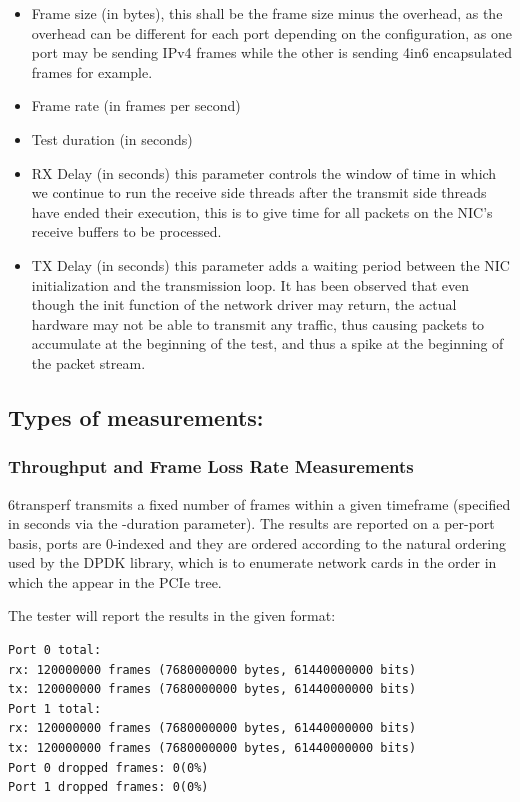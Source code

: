 \documentclass[a4paper,12p,titlepage]{article}
\begin{document}
\begin{itemize}
\item Frame size (in bytes), this shall be the frame size minus the overhead, as the overhead can be different for each port depending on the configuration, as one port may be sending IPv4 frames while the other is sending 4in6 encapsulated frames for example.


\item Frame rate (in frames per second)

\item Test duration (in seconds)

\item RX Delay (in seconds) this parameter controls the window of time in which we continue to run the receive side threads after the transmit side threads have ended their execution, this is to give time for all packets on the NIC’s receive buffers to be processed.

\item TX Delay (in seconds) this parameter adds a waiting period between the NIC initialization and the transmission loop. It has been observed that even though the init function of the network driver may return, the actual hardware may not be able to transmit any traffic, thus causing packets to accumulate at the beginning of the test, and thus a spike at the beginning of the packet stream.
\end{itemize}

\subsection{Types of measurements:}
\subsubsection{Throughput and Frame Loss Rate Measurements}

6transperf transmits a fixed number of frames within a given timeframe (specified in seconds via the -duration parameter). The results are reported on a per-port basis, ports are 0-indexed and they are ordered according to the natural ordering used by the DPDK library, which is to enumerate network cards in the order in which the appear in the PCIe tree.

The tester will report the results in the given format:

\begin{lstlisting}
Port 0 total:
rx: 120000000 frames (7680000000 bytes, 61440000000 bits)
tx: 120000000 frames (7680000000 bytes, 61440000000 bits)
Port 1 total:
rx: 120000000 frames (7680000000 bytes, 61440000000 bits)
tx: 120000000 frames (7680000000 bytes, 61440000000 bits)
Port 0 dropped frames: 0(0%)
Port 1 dropped frames: 0(0%)
\end{lstlisting}
\end{document}
